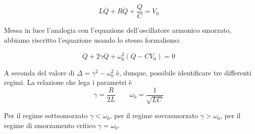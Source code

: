 \begin{equation}
L\ddot{Q}+R\dot{Q}+\frac{Q}{C}=V_{0}
\end{equation}

Messa in luce l'analogia con l'equazione dell'oscillatore armonico smorzato, abbiamo riscritto l'equazione usando lo stesso formalismo:

\begin{equation}
\ddot{Q}+2\gamma\dot{Q}+\omega_{0}^{2}(Q-CV_{0})=0
\end{equation}

A seconda del valore di $\Delta=\gamma^{2}-\omega_{0}^{2}$ è, dunque, possibile identificare tre differenti regimi. La relazione che lega i parametri è
$$
\gamma=\dfrac{R}{2L}\qquad \omega_0 = \dfrac{1}{\sqrt{LC}}
$$

Per il regime sottsomorzato $\gamma<\omega_{0}$,
per il regime sovrasmorzato $\gamma>\omega_{0}$,
per il regime di smorzamento critico $\gamma=\omega_{0}$.

